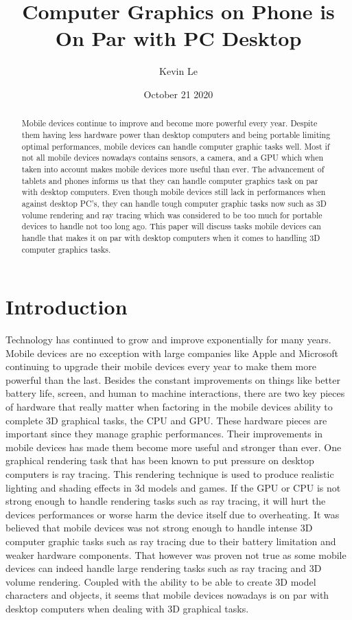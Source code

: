 \documentclass{article}
\title{Computer Graphics on Phone is On Par with PC Desktop}
\author{Kevin Le}
\date{October 21 2020}
\begin{document}
\maketitle

\begin{abstract}
Mobile devices continue to improve and become more powerful every year. Despite them having less hardware power than desktop computers and being portable limiting optimal performances, mobile devices can handle computer graphic tasks well. Most if not all mobile devices nowadays contains sensors, a camera, and a GPU which when taken into account makes mobile devices more useful than ever. The advancement of tablets and phones informs us that they can handle computer graphics task on par with desktop computers. Even though mobile devices still lack in performances when against desktop PC's, they can handle tough computer graphic tasks now such as 3D volume rendering and ray tracing which was considered to be too much for portable devices to handle not too long ago. This paper will discuss tasks mobile devices can handle that makes it on par with desktop computers when it comes to handling 3D computer graphics tasks. 
\end{abstract}

\section{Introduction}
Technology has continued to grow and improve exponentially for many years. Mobile devices are no exception with large companies like Apple and Microsoft continuing to upgrade their mobile devices every year to make them more powerful than the last. Besides the constant improvements on things like better battery life, screen, and human to machine interactions, there are two key pieces of hardware that really matter when factoring in the mobile devices ability to complete 3D graphical tasks, the CPU and GPU. These hardware pieces are important since they manage graphic performances. Their improvements in mobile devices has made them become more useful and stronger than ever. One graphical rendering task that has been known to put pressure on desktop computers is ray tracing. This rendering technique is used to produce realistic lighting and shading effects in 3d models and games. If the GPU or CPU is not strong enough to handle rendering tasks such as ray tracing, it will hurt the devices performances or worse harm the device itself due to overheating. It was believed that mobile devices was not strong enough to handle intense 3D computer graphic tasks such as ray tracing due to their battery limitation and weaker hardware components. That however was proven not true as some mobile devices can indeed handle large rendering tasks such as ray tracing and 3D volume rendering. Coupled with the ability to be able to create 3D model characters and objects, it seems that mobile devices nowadays is on par with desktop computers when dealing with 3D graphical tasks.
\end{document}
